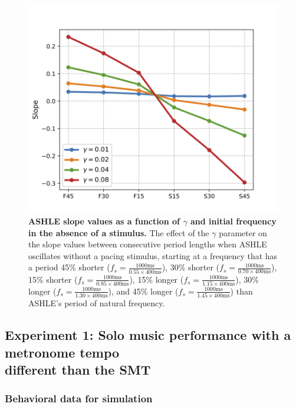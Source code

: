 \documentclass{report}
\begin{document}
\begin{figure}
    \centering
    \includegraphics[width=1.0\textwidth]{figures/fig3_8.png}
    \caption[ASHLE slope values as a function of $\gamma$ and initial frequency in the absence of a stimulus]{\textbf{ASHLE slope values as a function of $\gamma$ and initial frequency in the absence of a stimulus.} The effect of the $\gamma$ parameter on the slope values between consecutive period lengths when ASHLE oscillates without a pacing stimulus, starting at a frequency that has a period 45\% shorter ($f_s = \frac{1000\text{ms}}{0.55 \times 400\text{ms}}$), 30\% shorter ($f_s = \frac{1000\text{ms}}{0.70 \times 400\text{ms}}$), 15\% shorter ($f_s = \frac{1000\text{ms}}{0.85 \times 400\text{ms}}$), 15\% longer ($f_s = \frac{1000\text{ms}}{1.15 \times 400\text{ms}}$), 30\% longer ($f_s = \frac{1000\text{ms}}{1.30 \times 400\text{ms}}$), and 45\% longer ($f_s = \frac{1000\text{ms}}{1.45 \times 400\text{ms}}$) than ASHLE's period of natural frequency.}
    \label{f3_8}
\end{figure}

\subsection{Experiment 1: Solo music performance with a metronome tempo \\ different than the SMT}

\subsubsection{Behavioral data for simulation}
\end{document}
